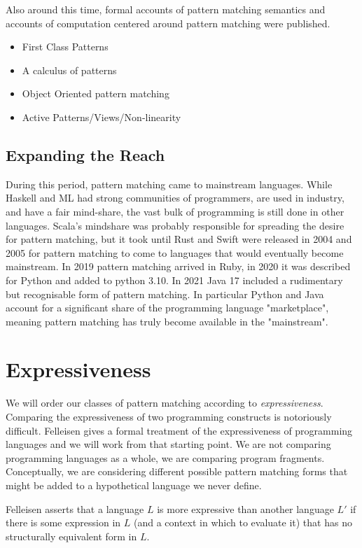 \documentclass[acmsmall]{acmart}
\begin{document}
Also around this time, formal accounts of pattern matching semantics and accounts of computation centered around pattern matching were published.  

\begin{itemize}
  \item First Class Patterns
  \item A calculus of patterns
  \item Object Oriented pattern matching
  \item Active Patterns/Views/Non-linearity
\end{itemize}

\subsection{Expanding the Reach}

During this period, pattern matching came to mainstream languages.  While Haskell and ML had strong communities of programmers, are used in industry, and have a fair mind-share, the vast bulk of programming is still done in other languages.  Scala's mindshare was probably responsible for spreading the desire for pattern matching, but it took until Rust and Swift were released in 2004 and 2005 for pattern matching to come to languages that would eventually become mainstream.  In 2019 pattern matching arrived in Ruby, in 2020 it was described for Python and added to python 3.10.  In 2021 Java 17 included a rudimentary but recognisable form of pattern matching.  In particular Python and Java account for a significant share of the programming language "marketplace", meaning pattern matching has truly become available in the "mainstream".

\section{Expressiveness}
\label{sec:express}
We will order our classes of pattern matching according to \emph{expressiveness}.  Comparing the expressiveness of two programming constructs is notoriously difficult.  Felleisen \cite{Felleisen91} gives a formal treatment of the expressiveness of programming languages and we will work from that starting point.  We are not comparing programming languages as a whole, we are comparing program fragments.  Conceptually, we are considering different possible pattern matching forms that might be added to a hypothetical language we never define.

Felleisen asserts that a language $L$ is more expressive than another language $L'$ if there is some expression in $L$ (and a context in which to evaluate it) that has no structurally equivalent form in $L$.
\end{document}
